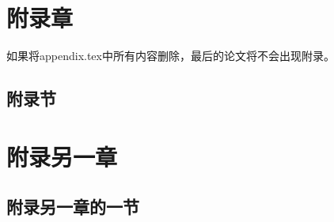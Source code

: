 
\chapter{附录章}
如果将appendix.tex中所有内容删除，最后的论文将不会出现附录。
\section{附录节}
\chapter{附录另一章}
\section{附录另一章的一节}
